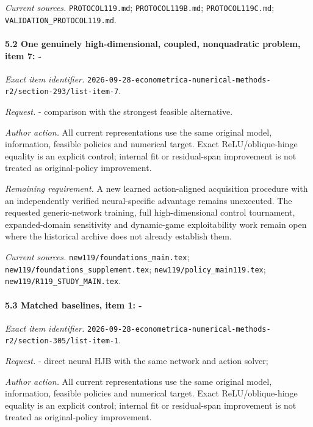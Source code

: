 \par\emph{Current sources.} \nolinkurl{PROTOCOL119.md}; \nolinkurl{PROTOCOL119B.md}; \nolinkurl{PROTOCOL119C.md}; \nolinkurl{VALIDATION_PROTOCOL119.md}.

\paragraph{5.2 One genuinely high-dimensional, coupled, nonquadratic problem, item 7: -}

\emph{Exact item identifier.} \nolinkurl{2026-09-28-econometrica-numerical-methods-r2/section-293/list-item-7}.

\par\emph{Request.} - comparison with the strongest feasible alternative.

\par\emph{Author action.} All current representations use the same original model, information, feasible policies and numerical target. Exact ReLU/\allowbreak{}oblique-hinge equality is an explicit control; internal fit or residual-span improvement is not treated as original-policy improvement.

\par\emph{Remaining requirement.} A new learned action-aligned acquisition procedure with an independently verified neural-specific advantage remains unexecuted. The requested generic-network training, full high-dimensional control tournament, expanded-domain sensitivity and dynamic-game exploitability work remain open where the historical archive does not already establish them.

\par\emph{Current sources.} \nolinkurl{new119/foundations_main.tex}; \nolinkurl{new119/foundations_supplement.tex}; \nolinkurl{new119/policy_main119.tex}; \nolinkurl{new119/R119_STUDY_MAIN.tex}.

\paragraph{5.3 Matched baselines, item 1: -}

\emph{Exact item identifier.} \nolinkurl{2026-09-28-econometrica-numerical-methods-r2/section-305/list-item-1}.

\par\emph{Request.} - direct neural HJB with the same network and action solver;

\par\emph{Author action.} All current representations use the same original model, information, feasible policies and numerical target. Exact ReLU/\allowbreak{}oblique-hinge equality is an explicit control; internal fit or residual-span improvement is not treated as original-policy improvement.

